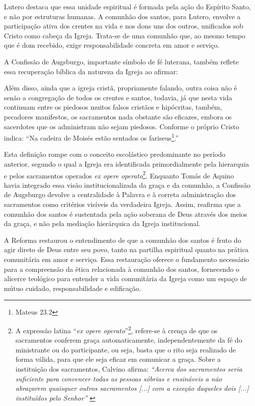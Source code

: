 Lutero destaca que essa unidade espiritual é formada pela ação do Espírito Santo, e não por estruturas humanas. A comunhão dos santos, para Lutero, envolve a participação ativa dos crentes na vida e nos dons uns dos outros, unificados sob Cristo como cabeça da Igreja. Trata-se de uma comunhão que, ao mesmo tempo que é dom recebido, exige responsabilidade concreta em amor e serviço.

A Confissão de Augsburgo, importante símbolo de fé luterana, também reflete essa recuperação bíblica da natureza da Igreja ao afirmar:
\begin{citacao}
Além disso, ainda que a igreja cristã, propriamente falando, outra coisa não é senão a congregação de todos os crentes e santos, todavia, já que nesta vida continuam entre os piedosos muitos falsos cristãos e hipócritas, também, pecadores manifestos, os sacramentos nada obstante são eficazes, embora os sacerdotes que os administram não sejam piedosos. Conforme o próprio Cristo indica: ``Na cadeira de Moisés estão sentados os fariseus\footnote{Mateus 23.2}.''\cite[Artigo~VII, p.~32]{livroConcordia}
\end{citacao}

Esta definição rompe com o conceito escolástico predominante no período anterior, segundo o qual a Igreja era identificada primordialmente pela hierarquia e pelos sacramentos operados \textit{\foreignlanguage{latin}{ex opere operato}}\footnote{A expressão latina ``\textit{\foreignlanguage{latin}{ex opere operato}}''\footnote{Tradução nossa: obra realizada}, refere-se à crença de que os sacramentos conferem graça automaticamente, independentemente da fé do ministrante ou do participante, ou seja, basta que o rito seja realizado de forma válida, para que ele seja eficaz em comunicar a graça. Sobre a instituição dos sacramentos, Calvino afirma: \textit{``Acerca dos sacramentos seria suficiente para convencer todas as pessoas sóbrias e ensináveis a não abraçarem quaisquer outros sacramentos [...] com a exceção daqueles dois [...] instituídos pelo Senhor''} \cite[v.~4, Capítulo~XIX, p.~2605]{calvino2022}}. Enquanto Tomás de Aquino havia integrado essa visão institucionalizada da graça e da comunhão, a Confissão de Augsburgo devolve a centralidade à Palavra e à correta administração dos sacramentos como critérios visíveis da verdadeira Igreja. Assim, reafirma que a comunhão dos santos é sustentada pela ação soberana de Deus através dos meios da graça, e não pela mediação hierárquica da Igreja institucional.

A Reforma restaurou o entendimento de que a comunhão dos santos é fruto do agir direto de Deus entre seu povo, tanto na partilha espiritual quanto na prática comunitária em amor e serviço. Essa restauração oferece o fundamento necessário para a compreensão da ética relacionada à comunhão dos santos, fornecendo o alicerce teológico para entender a vida comunitária da Igreja como um espaço de mútuo cuidado, responsabilidade e edificação.

